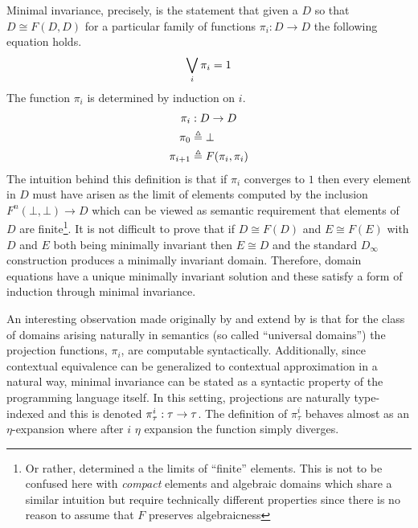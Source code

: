 Minimal invariance, precisely, is the statement that given a $D$ so
that $D \cong F(D, D)$ for a particular family of functions $\pi_i : D
\to D$ the following equation holds.
\[
  \bigvee_i \pi_i = 1
\]
The function $\pi_i$ is determined by induction on $i$.
\begin{align*}
  \pi_i &: D \to D\\
  \pi_0 &\mathrel{\triangleq} \bot\\
  \pi_{i + 1} &\mathrel{\triangleq} F(\pi_i, \pi_i)
\end{align*}
The intuition behind this definition is that if $\pi_i$ converges to
$1$ then every element in $D$ must have arisen as the limit of
elements computed by the inclusion $F^n(\bot, \bot) \to D$ which can
be viewed as semantic requirement that elements of $D$ are
finite\footnote{Or rather, determined a the limits of ``finite''
  elements. This is not to be confused here with \emph{compact} elements and
  algebraic domains which share a similar intuition but require
  technically different properties since there is no reason to assume
  that $F$ preserves algebraicness}. It is not difficult to prove that
if $D \cong F(D)$ and $E \cong F(E)$ with $D$ and $E$ both being
minimally invariant then $E \cong D$ and the standard $D_\infty$
construction produces a minimally invariant domain. Therefore, domain
equations have a unique minimally invariant solution and these satisfy
a form of induction through minimal invariance.

An interesting observation made originally by
\citet{Birkedal:99} and extend by
\citet{Crary:07} is that for the class of domains arising
naturally in semantics (so called ``universal domains'') the
projection functions, $\pi_i$, are computable
syntactically. Additionally, since contextual equivalence can be
generalized to contextual approximation in a natural way, minimal
invariance can be stated as a syntactic property of the programming
language itself. In this setting, projections are naturally
type-indexed and this is denoted $\pi_\tau^i : \tau \to \tau$. The
definition of $\pi_\tau^i$ behaves almost as an $\eta$-expansion where
after $i$ $\eta$ expansion the function simply diverges.

